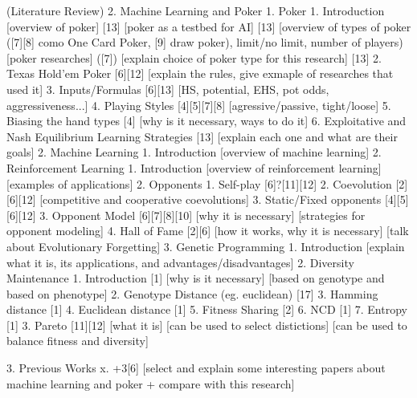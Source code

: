 (Literature Review)
2. Machine Learning and Poker
    1. Poker
        1. Introduction
            [overview of poker] [13]
            [poker as a testbed for AI] [13]
            [overview of types of poker ([7][8] como One Card Poker, [9] draw poker), limit/no limit, number of players)
            [poker researches] ([7])
            [explain choice of poker type for this research] [13]
        2. Texas Hold’em Poker [6][12]
            [explain the rules, give exmaple of researches that used it]
        3. Inputs/Formulas [6][13]
            [HS, potential, EHS, pot odds, aggressiveness...]
        4. Playing Styles [4][5][7][8]
            [agressive/passive, tight/loose]
        5. Biasing the hand types [4]
            [why is it necessary, ways to do it]
        6. Exploitative and Nash Equilibrium Learning Strategies [13]
            [explain each one and what are their goals]
    2. Machine Learning
        1. Introduction
            [overview of machine learning]
        2. Reinforcement Learning
            1. Introduction
                [overview of reinforcement learning]
                [examples of applications]
            2. Opponents
                1. Self-play [6]?[11][12]
                2. Coevolution [2][6][12]
                    [competitive and cooperative coevolutions]
                3. Static/Fixed opponents [4][5][6][12]
            3. Opponent Model [6][7][8][10]
                [why it is necessary]
                [strategies for opponent modeling]
            4. Hall of Fame [2][6]
                [how it works, why it is necessary]
                [talk about Evolutionary Forgetting]
        3. Genetic Programming
            1. Introduction
                [explain what it is, its applications, and advantages/disadvantages]
            2. Diversity Maintenance
                1. Introduction [1]
                    [why is it necessary]
                    [based on genotype and based on phenotype]
                2. Genotype Distance (eg. euclidean) [17]
                3. Hamming distance [1]
                4. Euclidean distance [1]
                5. Fitness Sharing [2]
                6. NCD [1]
                7. Entropy [1]
            3. Pareto [11][12]
                [what it is]
                [can be used to select distictions]
                [can be used to balance fitness and diversity]

    3. Previous Works
        x. +3[6] [select and explain some interesting papers about machine learning and poker + compare with this research]

